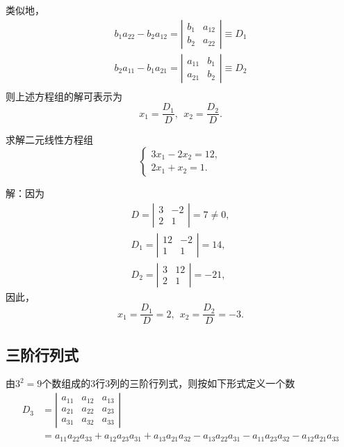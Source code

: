 
类似地，
$$
\begin{array}{l}
  b_1 a_{22} - b_2 a_{12} = \left|
  \begin{array}{cc}
    b_1 & a_{12} \\
    b_2 & a_{22} 
  \end{array}
          \right|  \equiv D_1\\[0.4cm]
  b_2 a_{11} - b_1 a_{21} = \left|
  \begin{array}{cc}
    a_{11} & b_1 \\
    a_{21} & b_2
  \end{array}
             \right|  \equiv D_2\\
\end{array}
$$      
则上述方程组的解可表示为
$$
x_1 = \frac{D_1}{D},\ \
x_2 = \frac{D_2}{D}.
$$

\begin{li}
  求解二元线性方程组
  $$
  \left\{
    \begin{array}{l}
      3x_1 - 2x_2 = 12, \\[0.2cm]
      2x_1 + x_2  = 1.
    \end{array}
  \right.
  $$
\end{li}
解：因为
$$
\begin{array}{l}
  D = \left|
  \begin{array}{cc}
    3 & -2 \\
    2 & 1 
  \end{array}
        \right| = 7 \ne 0,\\[0.4cm]
  D_1 = \left|
  \begin{array}{cc}
    12 & -2 \\
    1 & 1 
  \end{array}
        \right| = 14 , \\[0.4cm]
  D_2 = \left|
  \begin{array}{cc}
    3 & 12 \\
    2 & 1 
  \end{array}
        \right| = -21,
\end{array}
$$
因此，
$$
x_1=\frac{D_1}{D}=2, \ \ x_2 = \frac{D_2}{D} = -3.
$$

\subsection{三阶行列式}
\begin{dingyi}[三阶行列式]
  由$3^2=9$个数组成的3行3列的三阶行列式，则按如下形式定义一个数
  $$
  \begin{aligned}
    D_3 &= 
    \left|
      \begin{array}{ccc}
        a_{11} & a_{12} & a_{13} \\[0.2cm]
        a_{21} & a_{22} & a_{23} \\[0.2cm]
        a_{31} & a_{32} & a_{33} 
      \end{array}
    \right|
    \\
    &=  a_{11}a_{22}a_{33} + a_{12}a_{23}a_{31} + a_{13}a_{21}a_{32}
    - a_{13}a_{22}a_{31} - a_{11}a_{23}a_{32} - a_{12}a_{21}a_{33}
  \end{aligned}
  $$
\end{dingyi}

